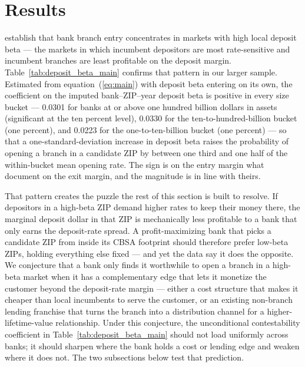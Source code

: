 
\section{Results}
\label{sec:results}

\citet{narayanan2025decline} establish that bank branch entry concentrates in markets with high local deposit beta --- the markets in which incumbent depositors are most rate-sensitive and incumbent branches are least profitable on the deposit margin. Table~\ref{tab:deposit_beta_main} confirms that pattern in our larger sample. Estimated from equation~(\ref{eq:main}) with deposit beta entering on its own, the coefficient on the imputed bank--ZIP--year deposit beta is positive in every size bucket --- 0.0301 for banks at or above one hundred billion dollars in assets (significant at the ten percent level), 0.0330 for the ten-to-hundred-billion bucket (one percent), and 0.0223 for the one-to-ten-billion bucket (one percent) --- so that a one-standard-deviation increase in deposit beta raises the probability of opening a branch in a candidate ZIP by between one third and one half of the within-bucket mean opening rate. The sign is on the entry margin what \citet{narayanan2025decline} document on the exit margin, and the magnitude is in line with theirs.

That pattern creates the puzzle the rest of this section is built to resolve. If depositors in a high-beta ZIP demand higher rates to keep their money there, the marginal deposit dollar in that ZIP is mechanically less profitable to a bank that only earns the deposit-rate spread. A profit-maximizing bank that picks a candidate ZIP from inside its CBSA footprint should therefore prefer low-beta ZIPs, holding everything else fixed --- and yet the data say it does the opposite. We conjecture that a bank only finds it worthwhile to open a branch in a high-beta market when it has a complementary edge that lets it monetize the customer beyond the deposit-rate margin --- either a cost structure that makes it cheaper than local incumbents to serve the customer, or an existing non-branch lending franchise that turns the branch into a distribution channel for a higher-lifetime-value relationship. Under this conjecture, the unconditional contestability coefficient in Table~\ref{tab:deposit_beta_main} should not load uniformly across banks; it should sharpen where the bank holds a cost or lending edge and weaken where it does not. The two subsections below test that prediction.

